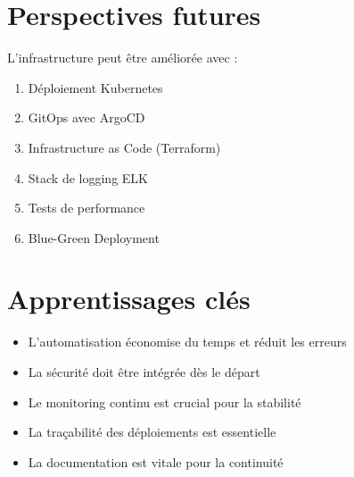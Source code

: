 \documentclass[12pt,a4paper]{report}
\begin{document}
\section*{Perspectives futures}

L'infrastructure peut être améliorée avec :

\begin{enumerate}
    \item Déploiement Kubernetes
    \item GitOps avec ArgoCD
    \item Infrastructure as Code (Terraform)
    \item Stack de logging ELK
    \item Tests de performance
    \item Blue-Green Deployment
\end{enumerate}

\section*{Apprentissages clés}

\begin{itemize}
    \item L'automatisation économise du temps et réduit les erreurs
    \item La sécurité doit être intégrée dès le départ
    \item Le monitoring continu est crucial pour la stabilité
    \item La traçabilité des déploiements est essentielle
    \item La documentation est vitale pour la continuité
\end{itemize}
\end{document}
